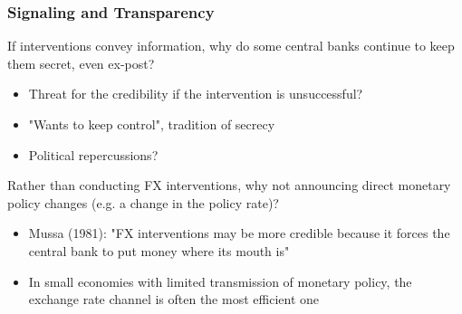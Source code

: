\documentclass{beamer}
\newenvironment{wideitemize}{\itemize\addtolength{\itemsep}{10pt}}{\enditemize}
\begin{document}
\begin{frame}
  \frametitle{Signaling and Transparency}
  \begin{wideitemize}
  \item If interventions convey information, why do some central banks continue to keep them secret, even ex-post?
    \begin{itemize}
    \item Threat for the credibility if the intervention is unsuccessful? 
    \item "Wants to keep control", tradition of secrecy
    \item Political repercussions?
    \end{itemize}
    
  \item Rather than conducting FX interventions, why not announcing direct monetary policy changes (e.g. a change in the policy rate)?
    \begin{itemize}
    \item Mussa (1981): "FX interventions may be more credible because it forces the central bank to put money where its mouth is"
    \item In small economies with limited transmission of monetary policy, the exchange rate channel is often the most efficient one
    \end{itemize}
  \end{wideitemize}
\end{frame}
\end{document}
